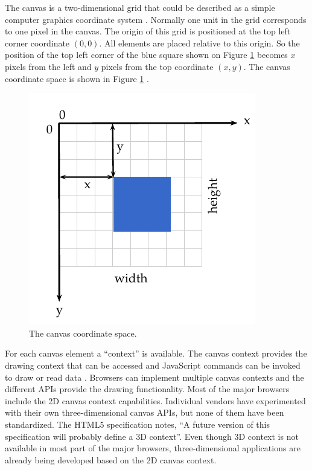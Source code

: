 The canvas is a two-dimensional grid that could be described as a simple computer graphics coordinate system \cite{Hartley2004}. Normally one unit in the grid corresponds to one pixel in the canvas. The origin of this grid is positioned at the top left corner coordinate $(0,0)$. All elements are placed relative to this origin. So the position of the top left corner of the blue square shown on Figure \ref{figure:canvas_axis} becomes $x$ pixels from the left and $y$ pixels from the top coordinate $(x,y)$. The canvas coordinate space is shown in Figure \ref{figure:canvas_axis} \cite{MDN2013}.

 \begin{figure}[!htb]
   \centering
   \includegraphics{chapters/basic_concepts/canvas_axis.pdf}
   \caption{The canvas coordinate space.}
   \label{figure:canvas_axis}
 \end{figure}

For each canvas element a ``context'' is available. The canvas context provides the drawing context that can be accessed and JavaScript commands can be invoked to draw or read data \cite{Canvas2013}. Browsers can implement multiple canvas contexts and the different APIs provide the drawing functionality. Most of the major browsers include the 2D canvas context capabilities. Individual vendors have experimented with their own three-dimensional canvas APIs, but none of them have been standardized. The HTML5 specification notes, ``A future version of this specification will probably define a 3D context''. Even though 3D context is not available in most part of the major browsers, three-dimensional applications are already being developed based on the 2D canvas context.

